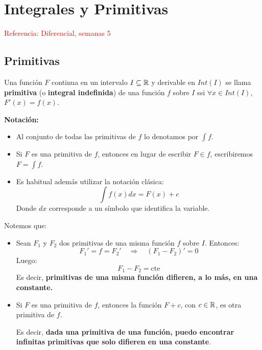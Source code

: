 
\section{Integrales y Primitivas}

\textcolor{red}{Referencia: Diferencial, semanas 5}

\subsection{Primitivas}

\begin{definicion}
	Una función $F$ continua en un intervalo $I\subseteq\mathbb{R}$ y derivable en $Int(I)$ se llama \textbf{primitiva} (o \textbf{integral indefinida}) de una función $f$ sobre $I$ ssi $\forall x \in Int(I)$, $F'(x) = f(x)$. 
	
	\textbf{Notación:} 
	\begin{itemize}
		\item Al conjunto de todas las primitivas de $f$ lo denotamos por $\displaystyle \int f$.
				
		\item Si $F$ es una primitiva de $f$, entonces en lugar de escribir $F \in \displaystyle f$, escribiremos $F =\displaystyle \int f$. 
		
		\item Es habitual además utilizar la notación clásica: 
		$$ \int f(x) dx = F(x) + c $$ 
		Donde $dx$ corresponde a un símbolo que identifica la variable. 
	\end{itemize} 
\end{definicion}

\begin{nota}
	Notemos que: 
	\begin{itemize}
		\item 	Sean $F_1$ y $F_2$ dos primitivas de una misma función $f$ sobre $I$. Entonces: 
		$$ F_1 ' = f = F_2 ' \quad \Longrightarrow \quad (F_1  - F_2) ' = 0 $$ 
		Luego: 
		$$ F_1 - F_2 = \text{cte} $$ 
		Es decir, \textbf{primitivas de una misma función difieren, a lo más, en una constante.}
		
		\item Si $F$ es una primitiva de $f$, entonces la función $F + c$, con $c\in \mathbb{R}$, es otra primitiva de $f$. 
		
		Es decir, \textbf{dada una primitiva de una función, puedo encontrar infinitas primitivas que solo difieren en una constante}. 
	\end{itemize}
\end{nota}

